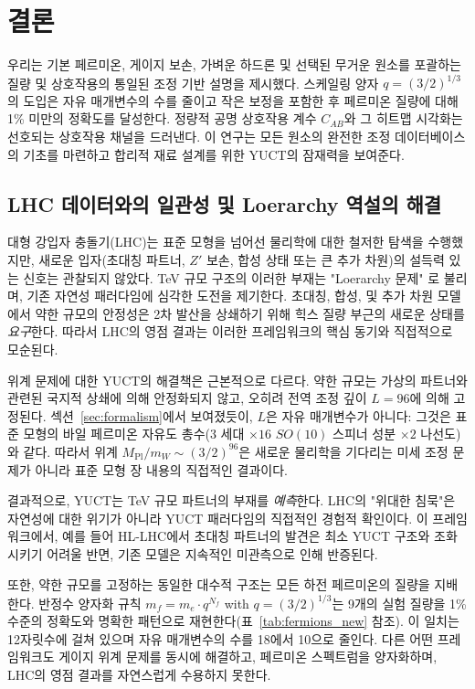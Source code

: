 \documentclass[11pt,a4paper]{article}
\begin{document}
	\section{결론}
	\label{sec:conclusion}
	
	우리는 기본 페르미온, 게이지 보손, 가벼운 하드론 및 선택된 무거운 원소를 포괄하는 질량 및 상호작용의 통일된 조정 기반 설명을 제시했다. 스케일링 양자 \(q = (3/2)^{1/3}\)의 도입은 자유 매개변수의 수를 줄이고 작은 보정을 포함한 후 페르미온 질량에 대해 1\% 미만의 정확도를 달성한다. 정량적 공명 상호작용 계수 \(C_{AB}\)와 그 히트맵 시각화는 선호되는 상호작용 채널을 드러낸다. 이 연구는 모든 원소의 완전한 조정 데이터베이스의 기초를 마련하고 합리적 재료 설계를 위한 YUCT의 잠재력을 보여준다.
	
	\subsection{LHC 데이터와의 일관성 및 Loerarchy 역설의 해결}
	
	대형 강입자 충돌기(LHC)는 표준 모형을 넘어선 물리학에 대한 철저한 탐색을 수행했지만, 새로운 입자(초대칭 파트너, $Z'$ 보손, 합성 상태 또는 큰 추가 차원)의 설득력 있는 신호는 관찰되지 않았다. TeV 규모 구조의 이러한 부재는 "Loerarchy 문제" \cite{Koren2020}로 불리며, 기존 자연성 패러다임에 심각한 도전을 제기한다. 초대칭, 합성, 및 추가 차원 모델에서 약한 규모의 안정성은 2차 발산을 상쇄하기 위해 힉스 질량 부근의 새로운 상태를 \emph{요구}한다. 따라서 LHC의 영점 결과는 이러한 프레임워크의 핵심 동기와 직접적으로 모순된다.
	
	위계 문제에 대한 YUCT의 해결책은 근본적으로 다르다. 약한 규모는 가상의 파트너와 관련된 국지적 상쇄에 의해 안정화되지 않고, 오히려 전역 조정 깊이 $L=96$에 의해 고정된다. 섹션~\ref{sec:formalism}에서 보여졌듯이, $L$은 자유 매개변수가 아니다: 그것은 표준 모형의 바일 페르미온 자유도 총수(3 세대 $\times 16$ $SO(10)$ 스피너 성분 $\times 2$ 나선도)와 같다. 따라서 위계 $M_{\mathrm{Pl}}/m_W \sim (3/2)^{96}$은 새로운 물리학을 기다리는 미세 조정 문제가 아니라 표준 모형 장 내용의 직접적인 결과이다.
	
	결과적으로, YUCT는 TeV 규모 파트너의 부재를 \emph{예측}한다. LHC의 "위대한 침묵"은 자연성에 대한 위기가 아니라 YUCT 패러다임의 직접적인 경험적 확인이다. 이 프레임워크에서, 예를 들어 HL-LHC에서 초대칭 파트너의 발견은 최소 YUCT 구조와 조화시키기 어려울 반면, 기존 모델은 지속적인 미관측으로 인해 반증된다.
	
	또한, 약한 규모를 고정하는 동일한 대수적 구조는 모든 하전 페르미온의 질량을 지배한다. 반정수 양자화 규칙 $m_f = m_e \cdot q^{N_f}$ with $q = (3/2)^{1/3}$는 9개의 실험 질량을 1\% 수준의 정확도와 명확한 패턴으로 재현한다(표~\ref{tab:fermions_new} 참조). 이 일치는 12자릿수에 걸쳐 있으며 자유 매개변수의 수를 18에서 10으로 줄인다. 다른 어떤 프레임워크도 게이지 위계 문제를 동시에 해결하고, 페르미온 스펙트럼을 양자화하며, LHC의 영점 결과를 자연스럽게 수용하지 못한다.
	
\end{document}
